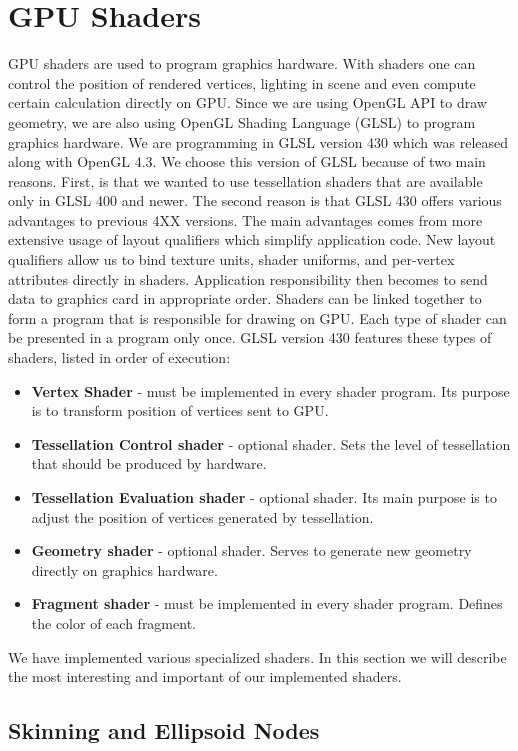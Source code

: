 \section{GPU Shaders}

GPU shaders are used to program graphics hardware.
With shaders one can control the position of rendered vertices, lighting in scene and even compute certain calculation directly on GPU.
Since we are using OpenGL API to draw geometry, we are also using OpenGL Shading Language (GLSL) to program graphics hardware.
We are programming in GLSL version 430 which was released along with OpenGL 4.3.
We choose this version of GLSL because of two main reasons.
First, is that we wanted to use tessellation shaders that are available only in GLSL 400 and newer.
The second reason is that GLSL 430 offers various advantages to previous 4XX versions.
The main advantages comes from more extensive usage of layout qualifiers which simplify application code.
New layout qualifiers allow us to bind texture units, shader uniforms, and per-vertex attributes directly in shaders.
Application responsibility then becomes to send data to graphics card in appropriate order.
Shaders can be linked together to form a program that is responsible for drawing on GPU.
Each type of shader can be presented in a program only once.
GLSL version 430 features these types of shaders, listed in order of execution:
\pagebreak
\begin{itemize}
	\itemsep-0.25em 
	\item \textbf{Vertex Shader} - must be implemented in every shader program. Its purpose is to transform position of vertices sent to GPU.
	\item \textbf{Tessellation Control shader} - optional shader. Sets the level of tessellation that should be produced by hardware.
	\item \textbf{Tessellation Evaluation shader} - optional shader. Its main purpose is to adjust the position of vertices generated by tessellation.
	\item \textbf{Geometry shader} - optional shader. Serves to generate new geometry directly on graphics hardware.
	\item \textbf{Fragment shader} - must be implemented in every shader program. Defines the color of each fragment.
\end{itemize}
We have implemented various specialized shaders.
In this section we will describe the most interesting and important of our implemented shaders.

\subsection{Skinning and Ellipsoid Nodes}

